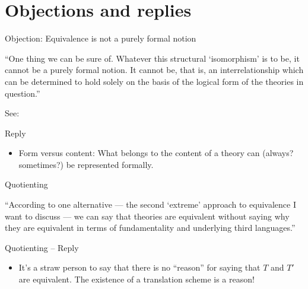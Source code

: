 \documentclass[fleqn]{beamer}
\begin{document}
\section{Objections and replies}



\begin{frame}{Objection: Equivalence is not a purely formal notion}

  ``One thing we can be sure of. Whatever this structural
  `isomorphism' is to be, it cannot be a purely formal notion. It
  cannot be, that is, an interrelationship which can be determined to
  hold solely on the basis of the logical form of the theories in
  question.'' \citep[p 93]{sklar}

  See: \cite{coffey,teitel,butterfield}
  



\end{frame}

\begin{frame}{Reply}

  \begin{itemize}
  \item Form versus content: What belongs to the content of a theory
    can (always? sometimes?) be represented formally.
  \end{itemize}
  


\end{frame}


\begin{frame}{Quotienting}

  ``According to one alternative --- the second `extreme' approach to
  equivalence I want to discuss --- we can say that theories are
  equivalent without saying why they are equivalent in terms of
  fundamentality and underlying third languages.'' \citep[p
  191]{sider}

\end{frame}


\begin{frame}{Quotienting -- Reply}

  \begin{itemize}
  \item It's a straw person to say that there is no ``reason'' for
    saying that $T$ and $T'$ are equivalent. The existence of a
    translation scheme is a reason!
  \end{itemize}

\end{frame}
\end{document}
